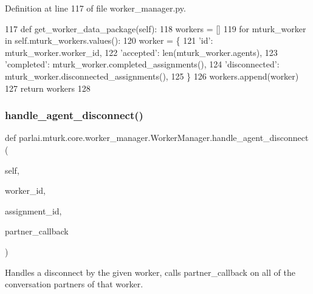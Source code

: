 Definition at line 117 of file worker\+\_\+manager.\+py.


\begin{DoxyCode}
117     \textcolor{keyword}{def }get\_worker\_data\_package(self):
118         workers = []
119         \textcolor{keywordflow}{for} mturk\_worker \textcolor{keywordflow}{in} self.mturk\_workers.values():
120             worker = \{
121                 \textcolor{stringliteral}{'id'}: mturk\_worker.worker\_id,
122                 \textcolor{stringliteral}{'accepted'}: len(mturk\_worker.agents),
123                 \textcolor{stringliteral}{'completed'}: mturk\_worker.completed\_assignments(),
124                 \textcolor{stringliteral}{'disconnected'}: mturk\_worker.disconnected\_assignments(),
125             \}
126             workers.append(worker)
127         \textcolor{keywordflow}{return} workers
128 
\end{DoxyCode}
\mbox{\label{classparlai_1_1mturk_1_1core_1_1worker__manager_1_1WorkerManager_a26f5469b17d425d52277f50b59e611f1}} 
\subsubsection{\texorpdfstring{handle\+\_\+agent\+\_\+disconnect()}{handle\_agent\_disconnect()}}
{\footnotesize\ttfamily def parlai.\+mturk.\+core.\+worker\+\_\+manager.\+Worker\+Manager.\+handle\+\_\+agent\+\_\+disconnect (\begin{DoxyParamCaption}\item[{}]{self,  }\item[{}]{worker\+\_\+id,  }\item[{}]{assignment\+\_\+id,  }\item[{}]{partner\+\_\+callback }\end{DoxyParamCaption})}

\begin{DoxyVerb}Handles a disconnect by the given worker, calls partner_callback on all of the
conversation partners of that worker.
\end{DoxyVerb}
 

